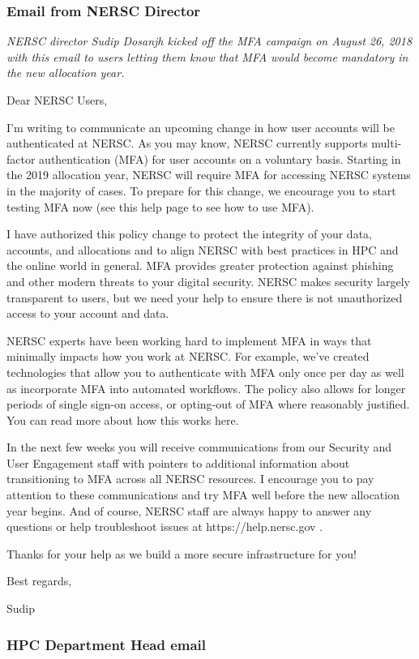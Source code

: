 \documentclass[sigconf,review]{acmart}
\begin{document}
\subsubsection{Email from NERSC Director}
{\em NERSC director Sudip Dosanjh kicked off the MFA campaign on August 26, 2018 with this email to users letting them know
that MFA would become mandatory in the new allocation year.}

Dear NERSC Users, 

I’m writing to communicate an upcoming change in how user accounts will be authenticated at NERSC. As you may know, NERSC currently supports multi-factor authentication (MFA) for user accounts on a voluntary basis. Starting in the 2019 allocation year, NERSC will require MFA for accessing NERSC systems in the majority of cases.  To prepare for this change, we encourage you to start testing MFA now (see this help page to see how to use MFA).

I have authorized this policy change to protect the integrity of your data, accounts, and allocations and to align NERSC with best practices in HPC and the online world in general.  MFA provides greater protection against phishing and other modern threats to your digital security.  NERSC makes security largely transparent to users, but we need your help to ensure there is not unauthorized access to your account and data.

NERSC experts have been working hard to implement MFA in ways that minimally impacts how you work at NERSC. For example, we’ve created technologies that allow you to authenticate with MFA only once per day as well as incorporate  MFA into automated workflows.  The policy also allows for longer periods of single sign-on access, or opting-out of MFA where reasonably justified. You can read more about how this works here.

In the next few weeks you will receive communications from our Security and User Engagement staff with pointers to additional information about transitioning to MFA across all NERSC resources. I encourage you to pay attention to these communications and try MFA well before the new allocation year begins. And of course, NERSC staff are always happy to answer any questions or help troubleshoot issues at https://help.nersc.gov .

Thanks for your help as we build a more secure infrastructure for you!

Best regards,

Sudip

\subsubsection{HPC Department Head email}
\end{document}
